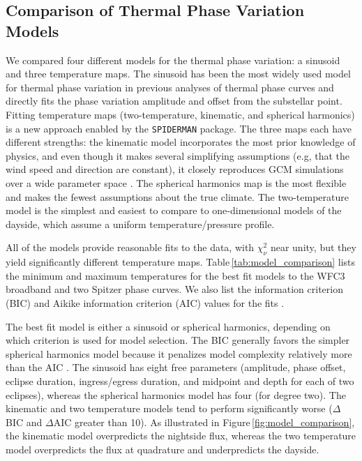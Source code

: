 \documentclass[twocolumn]{aastex61}
\begin{document}
\subsection{Comparison of Thermal Phase Variation Models}
We compared four different models for the thermal phase variation: a sinusoid and three temperature maps. The sinusoid has been the most widely used model for thermal phase variation in previous analyses of thermal phase curves \citep{FIXME} and directly fits the phase variation amplitude and offset from the substellar point. Fitting temperature maps (two-temperature, kinematic, and spherical harmonics) is a new approach enabled by the \texttt{SPIDERMAN} package.  The three maps each have different strengths: the kinematic model incorporates the most prior knowledge of physics, and even though it makes several simplifying assumptions (e.g, that the wind speed and direction are constant), it closely reproduces GCM simulations over a wide parameter space \citep{zhang16}.   The spherical harmonics map is the most flexible and makes the fewest assumptions about the true climate. The two-temperature model is the simplest and easiest to compare to one-dimensional models of the dayside, which assume a uniform temperature/pressure profile.  

All of the models provide reasonable fits to the data, with $\chi^2_\nu$ near unity, but they yield significantly different temperature maps. Table\,\ref{tab:model_comparison} lists the minimum and maximum temperatures for the best fit models to the WFC3 broadband and two Spitzer phase curves. We also list the  information criterion (BIC) and Aikike information criterion (AIC) values for the fits \citep[a $\Delta$BIC value greater than 10 constitutes strong evidence against a given model;][]{kass95}.


The best fit model is either a sinusoid or spherical harmonics, depending on which criterion is used for model selection. The BIC generally favors the simpler spherical harmonics model because it penalizes model complexity relatively more than the AIC \citep{kass95}. The sinusoid has eight free parameters (amplitude, phase offset, eclipse duration, ingress/egress duration, and midpoint and depth for each of two eclipses), whereas the spherical harmonics model has four (for degree two).  The kinematic and two temperature models tend to perform significantly worse ($\Delta$BIC and $\Delta$AIC greater than 10).  As illustrated in Figure\,\ref{fig:model_comparison}, the kinematic model overpredicts the nightside flux, whereas the two temperature model overpredicts the flux at quadrature and underpredicts the dayside. 
\end{document}
